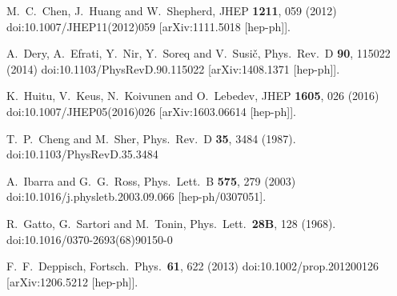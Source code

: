 \documentclass[aps,prd,groupaddress,floatfix,tighten,nofootinbib,showpacs,
amsfonts,superscriptaddress]{revtex4}
\begin{document}
{\begin{thebibliography}{99}
  
  M.~C.~Chen, J.~Huang and W.~Shepherd,
  JHEP {\bf 1211}, 059 (2012)
  doi:10.1007/JHEP11(2012)059
  [arXiv:1111.5018 [hep-ph]].
  
  A.~Dery, A.~Efrati, Y.~Nir, Y.~Soreq and V.~Susič,
  Phys.\ Rev.\ D {\bf 90}, 115022 (2014)
  doi:10.1103/PhysRevD.90.115022
  [arXiv:1408.1371 [hep-ph]].
  
  K.~Huitu, V.~Keus, N.~Koivunen and O.~Lebedev,
  JHEP {\bf 1605}, 026 (2016)
  doi:10.1007/JHEP05(2016)026
  [arXiv:1603.06614 [hep-ph]].
  
  T.~P.~Cheng and M.~Sher,
  Phys.\ Rev.\ D {\bf 35}, 3484 (1987).
  doi:10.1103/PhysRevD.35.3484
  
  A.~Ibarra and G.~G.~Ross,
  Phys.\ Lett.\ B {\bf 575}, 279 (2003)
  doi:10.1016/j.physletb.2003.09.066
  [hep-ph/0307051].
  
  R.~Gatto, G.~Sartori and M.~Tonin,
  Phys.\ Lett.\  {\bf 28B}, 128 (1968).
  doi:10.1016/0370-2693(68)90150-0
  
  F.~F.~Deppisch,
  Fortsch.\ Phys.\  {\bf 61}, 622 (2013)
  doi:10.1002/prop.201200126
  [arXiv:1206.5212 [hep-ph]].
  

\end{thebibliography}}
\end{document}
